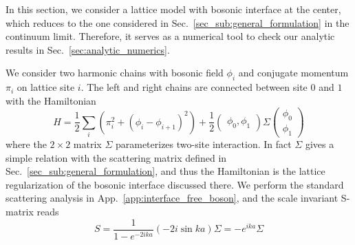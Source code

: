 
In this section, we consider a lattice model with bosonic interface at the center\cite{peschel_exact_2012,calabrese_entanglement_2012}, which reduces to the one considered in Sec.~\ref{sec_sub:general_formulation} in the continuum limit\cite{sakai_entanglement_2008}. Therefore, it serves as a numerical tool to check our analytic results in Sec.~\ref{sec:analytic_numerics}. 


We consider two harmonic chains with bosonic field $\phi_i$ and conjugate momentum $\pi_i$ on lattice site $i$. The left and right chains are connected between site $0$ and $1$ with the Hamiltonian
\begin{equation}
\label{eq:lattice_H}
H = \frac{1}{2} \sum_i \left(\pi_i^2  + ( \phi_i - \phi_{i+1} )^2 \right) +  \frac{1}{2} \begin{pmatrix}  \phi_0, \phi_1 \end{pmatrix}
\Sigma
\begin{pmatrix}
\phi_0 \\
\phi_1 
\end{pmatrix}
\end{equation}
where the $2\times2$ matrix $\Sigma$ parameterizes two-site interaction. In fact $\Sigma$ gives a simple relation with the scattering matrix defined in Sec.~\ref{sec_sub:general_formulation}, and thus the Hamiltonian is the lattice regularization of the bosonic interface discussed there. We perform the standard scattering analysis in App.~\ref{app:interface_free_boson}, and the scale invariant S-matrix reads
\begin{equation}
S = \frac{1}{1 - e^{-2ika } } ( -2i \sin ka ) \Sigma
 = - e^{ika} \Sigma
\end{equation}
